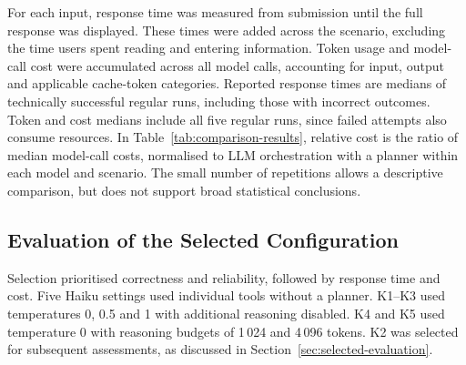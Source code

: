 For each input, response time was measured from submission until the full response was displayed.
These times were added across the scenario, excluding the time users spent reading and entering information.
Token usage and model-call cost were accumulated across all model calls, accounting for input, output and applicable cache-token categories.
Reported response times are medians of technically successful regular runs, including those with incorrect outcomes.
Token and cost medians include all five regular runs, since failed attempts also consume resources.
In Table~\ref{tab:comparison-results}, relative cost is the ratio of median model-call costs, normalised to LLM orchestration with a planner within each model and scenario.
The small number of repetitions allows a descriptive comparison, but does not support broad statistical conclusions.

\subsection{Evaluation of the Selected Configuration}
Selection prioritised correctness and reliability, followed by response time and cost.
Five Haiku settings used individual tools without a planner.
K1--K3 used temperatures 0, 0.5 and 1 with additional reasoning disabled.
K4 and K5 used temperature 0 with reasoning budgets of 1\,024 and 4\,096 tokens.
K2 was selected for subsequent assessments, as discussed in Section~\ref{sec:selected-evaluation}.

